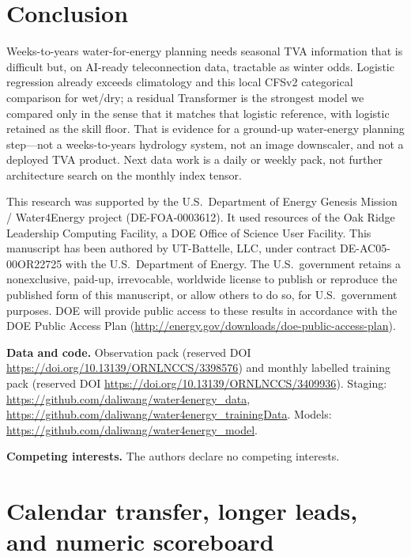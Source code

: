 \documentclass{article}
\begin{document}
\section{Conclusion}

Weeks-to-years water-for-energy planning needs seasonal TVA information that is difficult but, on AI-ready teleconnection data, tractable as winter odds. Logistic regression already exceeds climatology and this local CFSv2 categorical comparison for wet/dry; a residual Transformer is the strongest model we compared only in the sense that it matches that logistic reference, with logistic retained as the skill floor. That is evidence for a ground-up water-energy planning step---not a weeks-to-years hydrology system, not an image downscaler, and not a deployed TVA product. Next data work is a daily or weekly pack, not further architecture search on the monthly index tensor.

\begin{ack}
This research was supported by the U.S.\ Department of Energy Genesis Mission / Water4Energy project (DE-FOA-0003612). It used resources of the Oak Ridge Leadership Computing Facility, a DOE Office of Science User Facility. This manuscript has been authored by UT-Battelle, LLC, under contract DE-AC05-00OR22725 with the U.S.\ Department of Energy. The U.S.\ government retains a nonexclusive, paid-up, irrevocable, worldwide license to publish or reproduce the published form of this manuscript, or allow others to do so, for U.S.\ government purposes. DOE will provide public access to these results in accordance with the DOE Public Access Plan (\url{http://energy.gov/downloads/doe-public-access-plan}).

\textbf{Data and code.} Observation pack (reserved DOI \url{https://doi.org/10.13139/ORNLNCCS/3398576}) and monthly labelled training pack (reserved DOI \url{https://doi.org/10.13139/ORNLNCCS/3409936}). Staging: \url{https://github.com/daliwang/water4energy_data}, \url{https://github.com/daliwang/water4energy_trainingData}. Models: \url{https://github.com/daliwang/water4energy_model}.

\textbf{Competing interests.} The authors declare no competing interests.
\end{ack}

\appendix
\section{Calendar transfer, longer leads, and numeric scoreboard}
\label{app:bounds}
\end{document}
